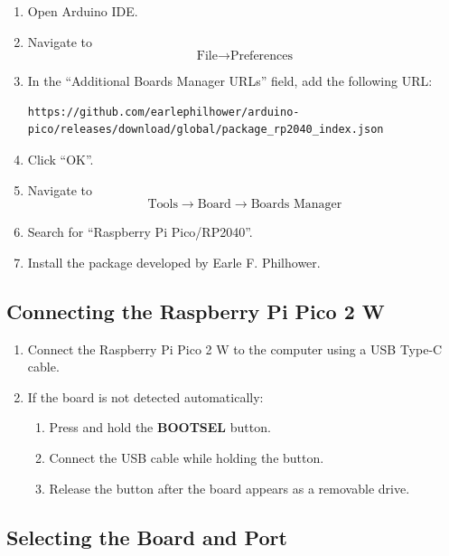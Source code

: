 \documentclass[12pt,a4paper]{article}
\begin{document}
\begin{enumerate}
    \item Open Arduino IDE.
    \item Navigate to
    \[
    \text{File} \rightarrow \text{Preferences}
    \]
    
    \item In the ``Additional Boards Manager URLs'' field, add the following URL:
    
\begin{verbatim}
https://github.com/earlephilhower/arduino-pico/releases/download/global/package_rp2040_index.json
\end{verbatim}

    \item Click ``OK''.
    
    \item Navigate to
    \[
    \text{Tools} \rightarrow \text{Board} \rightarrow \text{Boards Manager}
    \]

    \item Search for ``Raspberry Pi Pico/RP2040''.

    \item Install the package developed by Earle F. Philhower.
\end{enumerate}

\subsection{Connecting the Raspberry Pi Pico 2 W}

\begin{enumerate}
    \item Connect the Raspberry Pi Pico 2 W to the computer using a USB Type-C cable.
    
    \item If the board is not detected automatically:
    \begin{enumerate}
        \item Press and hold the \textbf{BOOTSEL} button.
        \item Connect the USB cable while holding the button.
        \item Release the button after the board appears as a removable drive.
    \end{enumerate}
\end{enumerate}

\subsection{Selecting the Board and Port}
\end{document}
